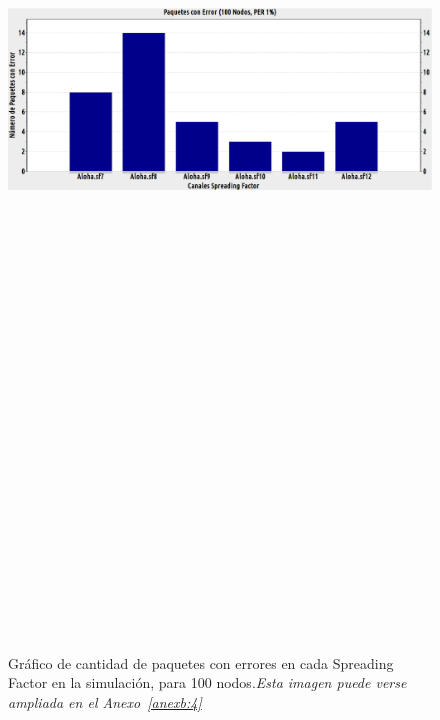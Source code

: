 \begin{justify}
\begin{figure}[!ht]
\includegraphics[width=13cm,height=30cm,keepaspectratio]{images/errores100nodos.eps}
\caption{Gráfico de cantidad de paquetes con errores en cada Spreading Factor en la simulación, para 100 nodos.\textit{Esta imagen puede verse ampliada en el Anexo~\ref{anexb:4}}}
\label{prueba:5}
\end{figure}
\end{justify}